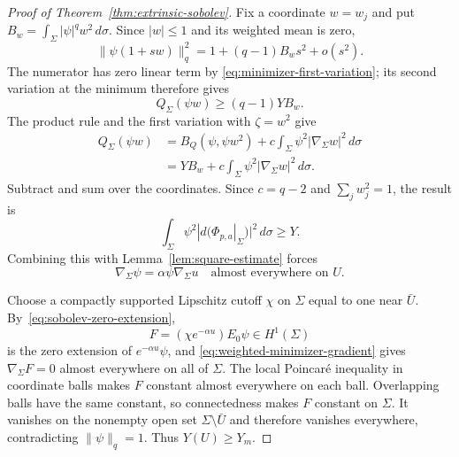 \begin{proof}[Proof of Theorem~\ref{thm:extrinsic-sobolev}]
Fix a coordinate $w=w_j$ and put
$B_w=\int_\Sigma|\psi|^q w^2\,d\sigma$. Since $|w|\le1$ and
its weighted mean is zero,
\[
 \|\psi(1+sw)\|_q^2=1+(q-1)B_ws^2+o(s^2).
\]
The numerator has zero linear term by
\eqref{eq:minimizer-first-variation}; its second variation at the
minimum therefore gives
\begin{equation}
\label{eq:minimizer-second-variation}
 Q_\Sigma(\psi w)\ge(q-1)YB_w.
\end{equation}
The product rule and the first variation with $\zeta=w^2$ give
\begin{equation}
\label{eq:coordinate-product-identity}
\begin{aligned}
 Q_\Sigma(\psi w)
 &=B_Q(\psi,\psi w^2)
       +c\int_\Sigma\psi^2|\nabla_\Sigma w|^2\,d\sigma\\
 &=YB_w+c\int_\Sigma\psi^2|\nabla_\Sigma w|^2\,d\sigma.
\end{aligned}
\end{equation}
Subtract and sum over the coordinates. Since $c=q-2$ and
$\sum_jw_j^2=1$, the result is
\begin{equation}
\label{eq:balanced-map-energy}
 \int_\Sigma\psi^2|d(\Phi_{p,a}|_\Sigma)|^2\,d\sigma\ge Y.
\end{equation}
Combining this with Lemma~\ref{lem:square-estimate} forces
\begin{equation}
\label{eq:weighted-minimizer-gradient}
 \nabla_\Sigma\psi=\alpha\psi\nabla_\Sigma u
 \quad\text{almost everywhere on }U.
\end{equation}

Choose a compactly supported Lipschitz cutoff $\chi$ on $\Sigma$
equal to one near $\bar U$. By~\eqref{eq:sobolev-zero-extension},
\[
 F=(\chi e^{-\alpha u})E_0\psi\in H^1(\Sigma)
\]
is the zero extension of $e^{-\alpha u}\psi$, and
\eqref{eq:weighted-minimizer-gradient} gives $\nabla_\Sigma F=0$
almost everywhere on all of $\Sigma$. The local Poincar\'e inequality
in coordinate balls makes $F$ constant almost everywhere on each ball.
Overlapping balls have the same constant, so connectedness makes $F$
constant on $\Sigma$. It vanishes on the nonempty open set
$\Sigma\setminus\bar U$ and therefore vanishes everywhere,
contradicting $\|\psi\|_q=1$. Thus $Y(U)\ge Y_m$.


\end{proof}
